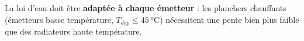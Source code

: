 \begin{attention}
  La loi d'eau doit être \textbf{adaptée à chaque émetteur} : les planchers chauffants (émetteurs basse température, $T_{dep} \leq \SI{45}{\celsius}$) nécessitent une pente bien plus faible que des radiateurs haute température.
\end{attention}

